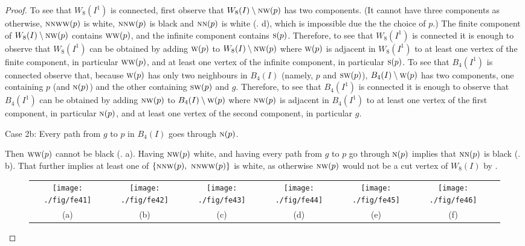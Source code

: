 \documentclass[lotsofwhite,charterfonts]{patmorin}
\newcommand{\N}{\textsc{n}}
\renewcommand{\S}{\textsc{s}}
\newcommand{\SW}{\textsc{sw}}
\newcommand{\W}{\textsc{w}}
\newcommand{\NW}{\textsc{nw}}
\newcommand{\sm}{\ensuremath{\setminus}}
\begin{document}
\begin{proof}
To see that $W_8(I^1)$ is connected, first observe that $W_8(I)\sm \NW(p)$ has two components. (It cannot have three components as otherwise,  $\N\N\W\W(p)$ is white, $\N\N\W(p)$ is black and  $\N\N(p)$ is white (. d), which  is impossible due the the choice of $p$.) The finite component of $W_8(I)\sm \NW(p)$ contains $\W\W(p)$, and the infinite component contains $\S(p)$. Therefore, to see that $W_8(I^1)$ is connected it is enough to observe that $W_8(I^1)$ can be obtained by adding $\W(p)$ to $W_8(I)\sm \NW(p)$ where $\W(p)$ is adjacent in $W_8(I^1)$ to at least one vertex of the finite component, in particular $\W\W(p)$, and at least one vertex of the infinite component, in particular $\S(p)$. To see that $B_4(I^1)$ is connected observe that, because $\W(p)$ has only two neighbours in $B_4(I)$ (namely, $p$ and $\SW(p)$), $B_4(I)\sm \W(p)$ has two components, one containing $p$ (and $\N(p)$) and the other containing $\SW(p)$ and $g$. Therefore, to see that $B_4(I^1)$ is connected it is enough to observe that $B_4(I^1)$ can be obtained by adding $\NW(p)$ to $B_4(I)\sm \W(p)$ where $\NW(p)$ is adjacent in $B_4(I^1)$ to at least one vertex of the first component, in particular $\N(p)$, and at least one vertex of the second component, in particular $g$. 


\noindent Case 2b: Every path from $g$ to $p$ in $B_4(I)$ goes through $\N(p)$. 

Then $\W\W(p)$ cannot be black (. a). Having $\NW(p)$ white, and having every path from $g$ to $p$ go through $\N(p)$ implies that $\N\N(p)$ is black (. b). That further implies  at least one of $\{\N\NW(p),\ \N\NW\W(p)\}$ is white, as otherwise $\NW(p)$ would not be a cut vertex of $W_8(I)$ by . 

\begin{figure}[htbp]
\begin{center}
\begin{tabular}{ccccccc}
\texttt{[image: ./fig/fe41]} &
\texttt{[image: ./fig/fe42]} &
\texttt{[image: ./fig/fe43]} &
\texttt{[image: ./fig/fe44]} &
\texttt{[image: ./fig/fe45]} &
\texttt{[image: ./fig/fe46]}
\\
(a) & (b) & (c) & (d) & (e) & (f)
\end{tabular}
\end{center}
\caption{}
\end{figure}


\end{proof}
\end{document}
